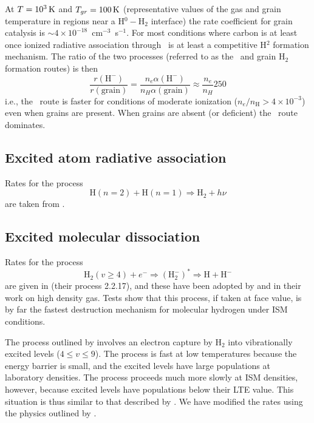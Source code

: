 At $T=10^3 {\rm\thinspace K}$ and $T_{gr}=100 {\rm\thinspace K}$ (representative values of the gas and grain
temperature in regions near a H$^0 - \mathrm{H}_2$ interface) the rate coefficient for
grain catalysis is $\sim 4\times 10^{-18}$~cm$^{-3}$~s$^{-1}$.  For most conditions where
carbon is at least once ionized radiative association through \hminus\ is at least
a competitive H$^2$ formation mechanism.  The ratio of the two processes
(referred to as the \hminus\ and grain H$_2$ formation routes) is then
\begin{equation}
\frac{{r\left( {{{\mathrm{H}}^ - }} \right)}}{{r\left( {{\mathrm{grain}}} \right)}}
= \frac{{{n_e}\alpha \left( {{{\mathrm{H}}^ - }} \right)}}{{{n_H}\alpha \left(
{{\mathrm{grain}}} \right)}} \approx \frac{{{n_e}}}{{{n_H}}}250
\end{equation}
i.e., the \hminus\ route is faster for conditions of moderate ionization
($n_e/n_{\mathrm{H}}>4\times 10^{-3}$) even when grains are present.  When grains are absent (or
deficient) the \hminus\ route dominates.

\subsection{Excited atom radiative association}

Rates for the process
\begin{equation}
{\mathrm{H}}\left( {n = 2} \right) + {\mathrm{H}}\left( {n = 1} \right) \Rightarrow
{{\mathrm{H}}_2} + h\nu
\end{equation}
are taken from \citet{Latter1991}.

\subsection{Excited molecular dissociation}

Rates for the process
\begin{equation}
{{\mathrm{H}}_2}\left( {v \ge 4} \right) + {e^ - } \Rightarrow {\left(
{{\mathrm{H}}_2^ - } \right)^*} \Rightarrow {\mathrm{H}} + {{\mathrm{H}}^ - }
\end{equation}
are given in \citet{Janev1987} (their process 2.2.17), and these have been
adopted by \citet{Lenzuni1991} and \citet{Crosas1993} in their
work on high density gas.  Tests show that this process, if taken at face
value, is by far the fastest destruction mechanism for molecular hydrogen
under ISM conditions.

The process outlined by \citet{Janev1987} involves an electron capture
by H$_2$ into vibrationally excited levels ($4 \le v \le 9$).   The process is fast
at low temperatures because the energy barrier is small, and the excited
levels have large populations at laboratory densities.  The process proceeds
much more slowly at ISM densities, however, because excited levels have
populations below their LTE value.  This situation is thus similar to that
described by \citet{Dalgarno1979}.  We have modified the \citet{Janev1987} rates using the physics outlined by \citet{Dalgarno1979}.

